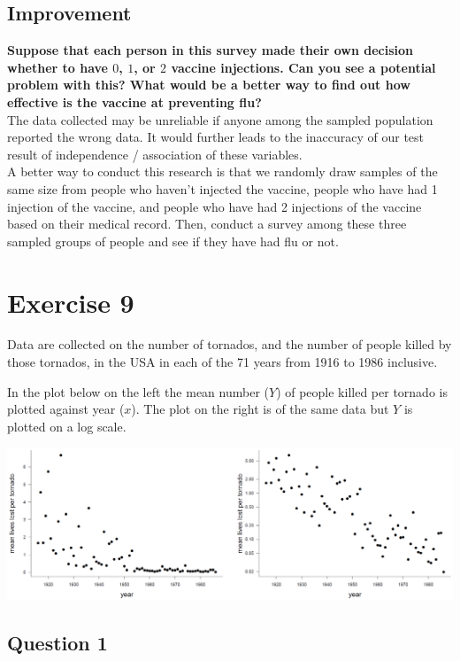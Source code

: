 \documentclass[
]{book}
\begin{document}
\section{Improvement}\label{improvement}

\textbf{Suppose that each person in this survey made their own decision whether to have \(0\), \(1\), or \(2\) vaccine injections. Can you see a potential problem with this? What would be a better way to find out how effective is the vaccine at preventing flu?}\\
The data collected may be unreliable if anyone among the sampled population reported the wrong data. It would further leads to the inaccuracy of our test result of independence / association of these variables.\\
A better way to conduct this research is that we randomly draw samples of the same size from people who haven't injected the vaccine, people who have had 1 injection of the vaccine, and people who have had 2 injections of the vaccine based on their medical record. Then, conduct a survey among these three sampled groups of people and see if they have had flu or not.

\chapter{Exercise 9}\label{exercise-9}

Data are collected on the number of tornados, and the number of people killed by those tornados, in the USA in each of the 71 years from 1916 to 1986 inclusive.

In the plot below on the left the mean number (\(Y\)) of people killed per tornado is plotted against year (\(x\)). The plot on the right is of the same data but \(Y\) is plotted on a log scale.

\includegraphics{tornado.png}

\section{Question 1}\label{question-1-5}
\end{document}
